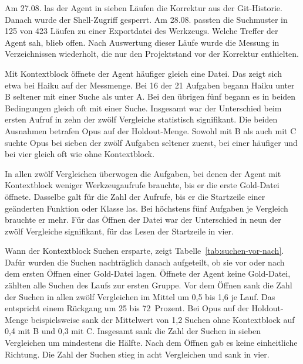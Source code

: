 \begin{ungelesen}
{Am 27.08. las der Agent in sieben Läufen die Korrektur aus der Git-Historie. Danach wurde der Shell-Zugriff gesperrt. Am 28.08. passten die Suchmuster in 125 von 423 Läufen zu einer Exportdatei des Werkzeugs. Welche Treffer der Agent sah, blieb offen. Nach Auswertung dieser Läufe wurde die Messung in Verzeichnissen wiederholt, die nur den Projektstand vor der Korrektur enthielten.

Mit Kontextblock öffnete der Agent häufiger gleich eine Datei. Das zeigt sich etwa bei Haiku auf der Messmenge. Bei 16 der 21 Aufgaben begann Haiku unter B seltener mit einer Suche als unter A. Bei den übrigen fünf begann es in beiden Bedingungen gleich oft mit einer Suche. Insgesamt war der Unterschied beim ersten Aufruf in zehn der zwölf Vergleiche statistisch signifikant. Die beiden Ausnahmen betrafen Opus auf der Holdout-Menge. Sowohl mit B als auch mit C suchte Opus bei sieben der zwölf Aufgaben seltener zuerst, bei einer häufiger und bei vier gleich oft wie ohne Kontextblock.

In allen zwölf Vergleichen überwogen die Aufgaben, bei denen der Agent mit Kontextblock weniger Werkzeugaufrufe brauchte, bis er die erste Gold-Datei öffnete. Dasselbe galt für die Zahl der Aufrufe, bis er die Startzeile einer geänderten Funktion oder Klasse las. Bei höchstens fünf Aufgaben je Vergleich brauchte er mehr. Für das Öffnen der Datei war der Unterschied in neun der zwölf Vergleiche signifikant, für das Lesen der Startzeile in vier.

Wann der Kontextblock Suchen ersparte, zeigt Tabelle~\ref{tab:suchen-vor-nach}. Dafür wurden die Suchen nachträglich danach aufgeteilt, ob sie vor oder nach dem ersten Öffnen einer Gold-Datei lagen. Öffnete der Agent keine Gold-Datei, zählten alle Suchen des Laufs zur ersten Gruppe. Vor dem Öffnen sank die Zahl der Suchen in allen zwölf Vergleichen im Mittel um 0,5 bis 1,6 je Lauf. Das entspricht einem Rückgang um 25 bis 72~Prozent. Bei Opus auf der Holdout-Menge beispielsweise sank der Mittelwert von 1,2 Suchen ohne Kontextblock auf 0,4 mit B und 0,3 mit C. Insgesamt sank die Zahl der Suchen in sieben Vergleichen um mindestens die Hälfte. Nach dem Öffnen gab es keine einheitliche Richtung. Die Zahl der Suchen stieg in acht Vergleichen und sank in vier.

}
\end{ungelesen}
